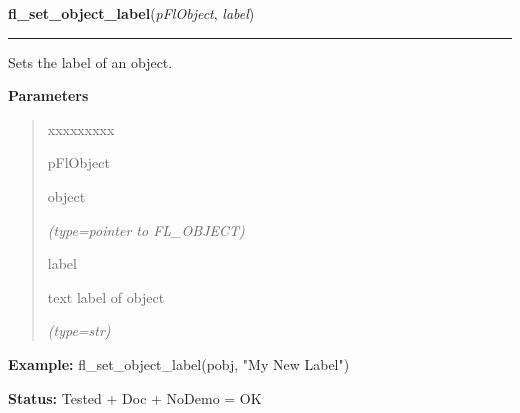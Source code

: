     \vspace{0.5ex}

\hspace{.8\funcindent}\begin{boxedminipage}{\funcwidth}

    \raggedright \textbf{fl\_set\_object\_label}(\textit{pFlObject}, \textit{label})

    \vspace{-1.5ex}

    \rule{\textwidth}{0.5\fboxrule}
\setlength{\parskip}{2ex}
    Sets the label of an object.

\setlength{\parskip}{1ex}
      \textbf{Parameters}
      \vspace{-1ex}

      \begin{quote}
        \begin{Ventry}{xxxxxxxxx}

          \item[pFlObject]

          object

            {\it (type=pointer to FL\_OBJECT)}

          \item[label]

          text label of object

            {\it (type=str)}

        \end{Ventry}

      \end{quote}

\textbf{Example:} fl\_set\_object\_label(pobj, "My New Label")



\textbf{Status:} Tested + Doc + NoDemo = OK



    \end{boxedminipage}

    \label{xformslib:flbasic:fl_get_object_label}

    \vspace{0.5ex}

